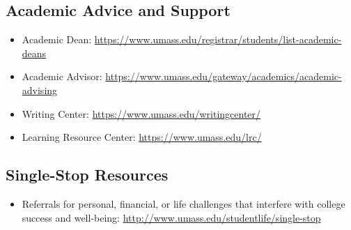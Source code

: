 \documentclass[11pt,twoside]{article}
\numberwithin{equation}{section}
\newcommand{\?}{\stackrel{?}{=}}
\begin{document}
\subsection{Academic Advice and Support}
\begin{itemize}
\item Academic Dean: \url{https://www.umass.edu/registrar/students/list-academic-deans}
\item  Academic Advisor: \url{https://www.umass.edu/gateway/academics/academic-advising}
\item  Writing Center: \url{https://www.umass.edu/writingcenter/}
\item  Learning Resource Center: \url{https://www.umass.edu/lrc/}
\end{itemize}

\subsection{Single-Stop Resources}
\begin{itemize}
\item  Referrals for personal, financial, or life challenges that interfere with college success and well-being: \url{http://www.umass.edu/studentlife/single-stop}

   \end{itemize}
\end{document}
